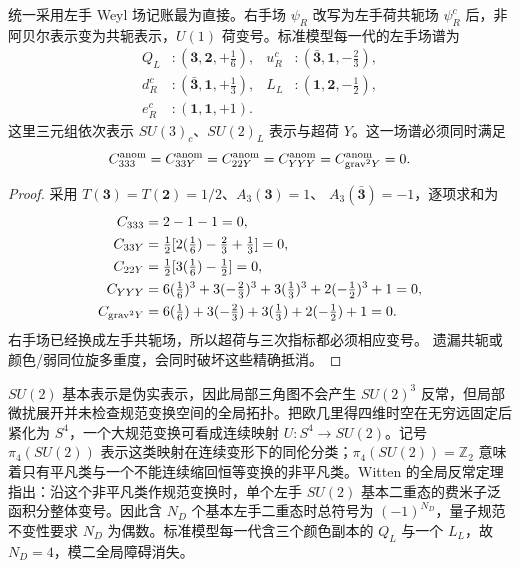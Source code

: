 \begin{proposition}[一代标准模型的局域规范反常抵消]
统一采用左手 Weyl 场记账最为直接。右手场 $\psi_R$ 改写为左手荷共轭场 $\psi_R^c$ 后，非阿贝尔表示变为共轭表示，$U(1)$ 荷变号。标准模型每一代的左手场谱为
\begin{align}
 Q_L&:(\mathbf3,\mathbf2,+\tfrac16),&
 u_R^c&:(\bar{\mathbf3},\mathbf1,-\tfrac23),\\
 d_R^c&:(\bar{\mathbf3},\mathbf1,+\tfrac13),&
 L_L&:(\mathbf1,\mathbf2,-\tfrac12),\\
 e_R^c&:(\mathbf1,\mathbf1,+1).
 \label{eq:sm-left-weyl-anomaly-set-dp11}
\end{align}
这里三元组依次表示 $SU(3)_c$、$SU(2)_L$ 表示与超荷 $Y$。这一场谱必须同时满足
\begin{equation}
 {
 C_{333}^{\rm anom}=
 C_{33Y}^{\rm anom}=
 C_{22Y}^{\rm anom}=
 C_{YYY}^{\rm anom}=
 C_{{\rm grav}^2Y}^{\rm anom}=0.}
 \label{eq:sm-gauge-anomaly-cancellation-dp32}
\end{equation}
\end{proposition}

\begin{proof}
采用 $T(\mathbf3)=T(\mathbf2)=1/2$、$A_3(\mathbf3)=1$、
$A_3(\bar{\mathbf3})=-1$，逐项求和为
\begin{align*}
C_{333}&=2-1-1=0,\\
C_{33Y}&=\tfrac12[2(\tfrac16)-\tfrac23+\tfrac13]=0,\\
C_{22Y}&=\tfrac12[3(\tfrac16)-\tfrac12]=0,\\
C_{YYY}&=6(\tfrac16)^3+3(-\tfrac23)^3+3(\tfrac13)^3
+2(-\tfrac12)^3+1=0,\\
C_{{\rm grav}^2Y}&=6(\tfrac16)+3(-\tfrac23)+3(\tfrac13)
+2(-\tfrac12)+1=0.
\end{align*}
右手场已经换成左手共轭场，所以超荷与三次指标都必须相应变号。
遗漏共轭或颜色/弱同位旋多重度，会同时破坏这些精确抵消。
\end{proof}

\begin{theorem}
$SU(2)$ 基本表示是伪实表示，因此局部三角图不会产生 $SU(2)^3$ 反常，但局部微扰展开并未检查规范变换空间的全局拓扑。把欧几里得四维时空在无穷远固定后紧化为 $S^4$，一个大规范变换可看成连续映射 $U:S^4\to SU(2)$。记号 $\pi_4(SU(2))$ 表示这类映射在连续变形下的同伦分类；$\pi_4(SU(2))=\mathbb Z_2$ 意味着只有平凡类与一个不能连续缩回恒等变换的非平凡类。Witten 的全局反常定理指出：沿这个非平凡类作规范变换时，单个左手 $SU(2)$ 基本二重态的费米子泛函积分整体变号。因此含 $N_D$ 个基本左手二重态时总符号为 $(-1)^{N_D}$，量子规范不变性要求 $N_D$ 为偶数。标准模型每一代含三个颜色副本的 $Q_L$ 与一个 $L_L$，故 $N_D=4$，模二全局障碍消失。

\end{theorem}

